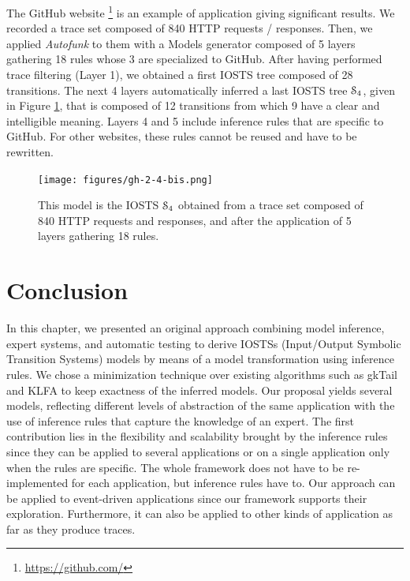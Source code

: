 The GitHub website \footnote{\url{https://github.com/}} is an
example of application giving significant results. We recorded a
trace set composed of 840 HTTP requests / responses. Then, we
applied \textit{Autofunk} to them with a Models generator
composed of 5 layers gathering 18 rules whose 3 are specialized
to GitHub. After having performed trace filtering (Layer 1), we
obtained a first IOSTS tree composed of 28 transitions. The next
4 layers automatically inferred a last IOSTS tree
$\EuScript{S}_4$, given in Figure \ref{fig:git:iosts}, that is
composed of 12 transitions from which 9 have a clear and
intelligible meaning. Layers 4 and 5 include inference rules that
are specific to GitHub. For other websites, these rules cannot be
reused and have to be rewritten.

\begin{figure}[ht]
    \begin{center}
        \texttt{[image: figures/gh-2-4-bis.png]}
    \end{center}

    \caption {This model is the IOSTS $\EuScript{S}_4$ obtained
    from a trace set composed of 840 HTTP requests and responses,
    and after the application of 5 layers gathering 18 rules.}
    \label{fig:git:iosts}
\end{figure}


\section{Conclusion}
\label{sec:modelinf:webapps:conclusion}

In this chapter, we presented an original approach combining
model inference, expert systems, and automatic testing to derive
IOSTSs (Input/Output Symbolic Transition Systems) models by means of a model transformation using inference
rules.  We chose a minimization technique over existing
algorithms such as gkTail and KLFA to keep exactness of the
inferred models. Our proposal yields several models, reflecting
different levels of abstraction of the same application with the
use of inference rules that capture the knowledge of an expert.
The first contribution lies in the flexibility and scalability
brought by the inference rules since they can be applied to
several applications or on a single application only when the
rules are specific. The whole framework does not have to be
re-implemented for each application, but inference rules have to.
Our approach can be applied to event-driven applications since
our framework supports their exploration. Furthermore, it can
also be applied to other kinds of application as far as they
produce traces.

